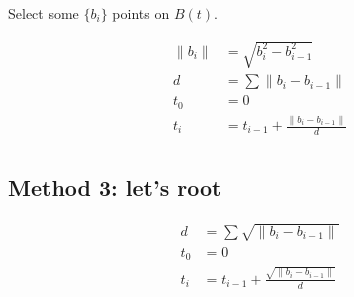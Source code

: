 \documentclass{scrartcl}
\begin{document}
Select some $\{b_i\}$ points on $B(t)$.

\begin{equation*}
\begin{split}
    \| b_i \| &= \sqrt{b_i^2 - b_{i-1}^2} \\
    d &= \sum \| b_i - b_{i-1} \| \\
    t_0 &= 0 \\
    t_i &= t_{i-1} + \frac{\| b_i - b_{i-1} \|}{d}\\
\end{split}
\end{equation*}

\subsection{Method 3: let's root}

\begin{equation*}
\begin{split}
    d &= \sum \sqrt{\| b_i - b_{i-1} \|} \\
    t_0 &= 0 \\
    t_i &= t_{i-1} + \frac{\sqrt{\| b_i - b_{i-1} \|}}{d}\\
\end{split}
\end{equation*}
\end{document}
